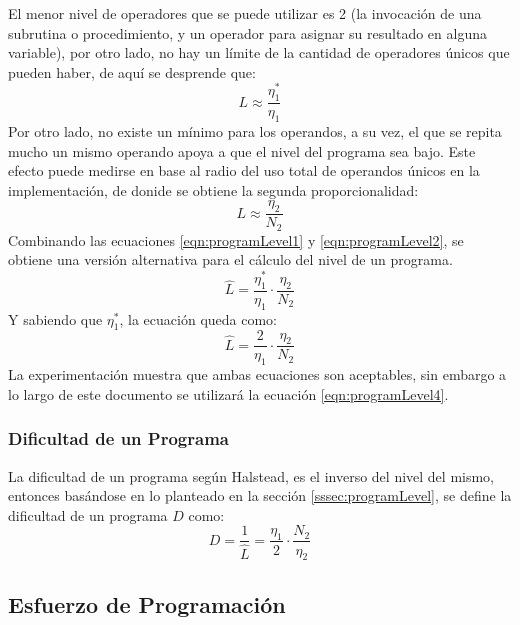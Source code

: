 \documentclass[letterpaper,12pt]{article}
\begin{document}
El menor nivel de operadores que se puede utilizar es 2 (la invocación de una subrutina o procedimiento, y un operador para asignar su resultado en alguna variable), por otro lado, no hay un límite de la cantidad de operadores únicos que pueden haber, de aquí se desprende que:
\begin{equation}
  \label{eqn:programLevel1}
  L \approx \frac{\eta_{1}^{*}}{\eta_{1}}
\end{equation}
Por otro lado, no existe un mínimo para los operandos, a su vez, el que se repita mucho un mismo operando apoya a que el nivel del programa sea bajo. Este efecto puede medirse en base al radio del uso total de operandos únicos en la implementación, de donide se obtiene la segunda proporcionalidad:
\begin{equation}
  \label{eqn:programLevel2}
  L \approx \frac{\eta_{2}}{N_{2}}
\end{equation}
Combinando las ecuaciones \ref{eqn:programLevel1} y \ref{eqn:programLevel2}, se obtiene una versión alternativa para el cálculo del nivel de un programa.
\begin{equation}
  \label{eqn:programLevel3}
  \hat{L} = \frac{\eta_{1}^{*}}{\eta_{1}} \cdot \frac{\eta_{2}}{N_{2}}
\end{equation}
Y sabiendo que $\eta_{1}^{*}$, la ecuación queda como:
\begin{equation}
  \label{eqn:programLevel4}
  \hat{L} = \frac{2}{\eta_{1}} \cdot \frac{\eta_{2}}{N_{2}}
\end{equation}
La experimentación muestra que ambas ecuaciones son aceptables, sin embargo a lo largo de este documento se utilizará la ecuación \ref{eqn:programLevel4}.

\subsubsection{Dificultad de un Programa}

La dificultad de un programa según Halstead, es el inverso del nivel del mismo, entonces basándose en lo planteado en la sección \ref{sssec:programLevel}, se define la dificultad de un programa $D$ como:
\begin{equation}
  D = \frac{1}{\hat{L}} = \frac{\eta_{1}}{2} \cdot \frac{N_{2}}{\eta_{2}}
\end{equation}

\subsection{Esfuerzo de Programación}
\end{document}
